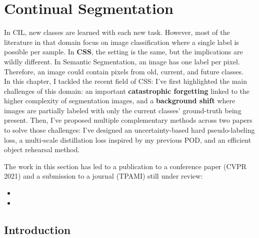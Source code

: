 \chapter{Continual Segmentation}
\label{chapter:segmentation}

\begin{chapabstract}
    In \acf{CIL}, new classes are learned with each new task. However, most of the literature in
    that domain focus on image classification where a single label is possible per sample. In
    \textbf{\acf{CSS}}, the setting is the same, but the implications are wildly different. In Semantic
    Segmentation, an image has one label per pixel. Therefore, an image could contain pixels from
    old, current, and future classes.
    \\
    In this chapter, I tackled the recent field of \acf{CSS}: I've first highlighted the main
    challenges of this domain: an important \textbf{catastrophic forgetting} linked to the higher complexity
    of segmentation images, and a \textbf{background shift} where images are partially labeled with
    only the current classes' ground-truth being present. Then, I've proposed multiple complementary
    methods across two papers to solve those challenges: I've designed an uncertainty-based
    hard pseudo-labeling loss, a multi-scale distillation loss inspired by my previous POD, and
    an efficient object rehearsal method.

    The work in this section has led to a publication to a conference paper (CVPR 2021) and a submission
    to a journal (TPAMI) still under review:

    \begin{itemize}
        \item {}
        \item {}
    \end{itemize}

\end{chapabstract}
\newpage

\minitoc
{}



\section{Introduction}
\label{sec:seg_intro}

